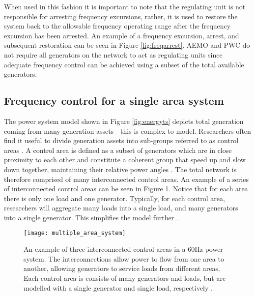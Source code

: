 When used in this fashion it is important to note that the regulating unit is not responsible for arresting frequency excursions, rather, it is used to restore the system back to the allowable frequency operating range after the frequency excursion has been arrested. An example of a frequency excursion, arrest, and subsequent restoration can be seen in Figure \ref{fig:freqarrest}. AEMO and PWC do not require all generators on the network to act as regulating units since adequate frequency control can be achieved using a subset of the total available generators.

\subsection{Frequency control for a single area system}\label{oneareapowersystem}
The power system model shown in Figure \ref{fig:energyts} depicts total generation coming from many generation assets - this is complex to model. Researchers often find it useful to divide generation assets into sub-groups referred to as control areas \cite{Kothari2011}. A control area is defined as a subset of generators which are in close proximity to each other and constitute a coherent group that speed up and slow down together, maintaining their relative power angles \cite{Kothari2011}. The total network is therefore comprised of many interconnected control areas. An example of a series of interconnected control areas can be seen in Figure \ref{fig:interconnectedpa}. Notice that for each area there is only one load and one generator. Typically, for each control area, researchers will aggregate many loads into a single load, and many generators into a single generator. This simplifies the model further \cite{Grainger1994}.
\begin{figure}[ht]
	\centering
	\texttt{[image: multiple\_area\_system]}
	\caption{An example of three interconnected control areas in a 60$\si{\hertz}$ power system. The interconnections allow power to flow from one area to another, allowing generators to service loads from different areas. Each control area is consists of many generators and loads, but are modelled with a single generator and single load, respectively \cite{Grainger1994}.}
	\label{fig:interconnectedpa}
\end{figure}

